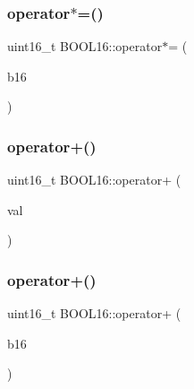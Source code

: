 \hypertarget{struct_b_o_o_l16_a12663cef2c489f2a4ac51c61f4bb229d}{}\label{struct_b_o_o_l16_a12663cef2c489f2a4ac51c61f4bb229d} 
\subsubsection{\texorpdfstring{operator$\ast$=()}{operator*=()}\hspace{0.1cm}{\footnotesize\ttfamily [2/2]}}
{\footnotesize\ttfamily uint16\+\_\+t B\+O\+O\+L16\+::operator$\ast$= (\begin{DoxyParamCaption}\item[{const \hyperlink{struct_b_o_o_l16}{B\+O\+O\+L16}}]{b16 }\end{DoxyParamCaption})\hspace{0.3cm}{\ttfamily [inline]}}

\hypertarget{struct_b_o_o_l16_a83abcd9bea7824fec9a443f6cd1ea4ef}{}\label{struct_b_o_o_l16_a83abcd9bea7824fec9a443f6cd1ea4ef} 
\subsubsection{\texorpdfstring{operator+()}{operator+()}\hspace{0.1cm}{\footnotesize\ttfamily [1/2]}}
{\footnotesize\ttfamily uint16\+\_\+t B\+O\+O\+L16\+::operator+ (\begin{DoxyParamCaption}\item[{const uint16\+\_\+t}]{val }\end{DoxyParamCaption})\hspace{0.3cm}{\ttfamily [inline]}}

\hypertarget{struct_b_o_o_l16_a7b3fdeeb158929cbe1b9e38b7e0addb1}{}\label{struct_b_o_o_l16_a7b3fdeeb158929cbe1b9e38b7e0addb1} 
\subsubsection{\texorpdfstring{operator+()}{operator+()}\hspace{0.1cm}{\footnotesize\ttfamily [2/2]}}
{\footnotesize\ttfamily uint16\+\_\+t B\+O\+O\+L16\+::operator+ (\begin{DoxyParamCaption}\item[{const \hyperlink{struct_b_o_o_l16}{B\+O\+O\+L16}}]{b16 }\end{DoxyParamCaption})\hspace{0.3cm}{\ttfamily [inline]}}

